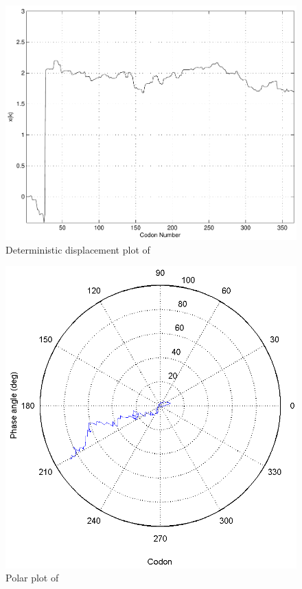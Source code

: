 \documentclass[12pt]{article}
\numberwithin{equation}{section}
\begin{document}
\begin{figure}
  \centering
  \caption{Deterministic displacement plot of~\prfB}
  \label{prfB:deterministic}
  \includegraphics[scale=0.4]{prfB/deterministic}
\end{figure}

\begin{figure}
  \centering
  \caption{Polar plot of \prfB}
  \label{prfB:polar}
  \includegraphics[scale=0.5]{prfB/polar}
\end{figure}
\end{document}

